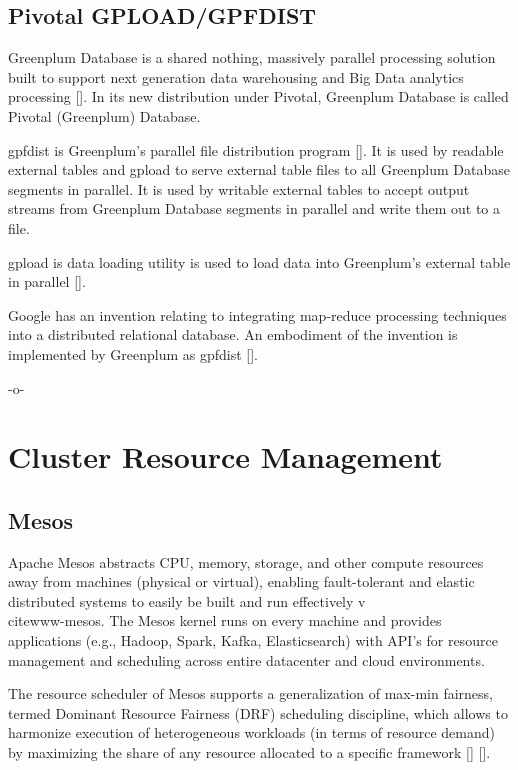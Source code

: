 \subsection{Pivotal GPLOAD/GPFDIST}

Greenplum Database is a shared nothing, massively parallel processing
solution built to support next generation data warehousing and Big
Data analytics processing [\cite{book-greenplum-gollapudi2013}]. In its
new distribution under Pivotal, Greenplum Database is called Pivotal
(Greenplum) Database.

gpfdist is Greenplum's parallel file distribution
program [\cite{www-gpfdist}]. It is used by readable external tables and
gpload to serve external table files to all Greenplum Database
segments in parallel. It is used by writable external tables to accept
output streams from Greenplum Database segments in parallel and write
them out to a file.

gpload is data loading utility is used to load data into Greenplum's
external table in parallel [\cite{book-greenplum-gollapudi2013}].

Google has an invention relating to integrating map-reduce processing
techniques into a distributed relational database. An embodiment of
the invention is implemented by Greenplum as
gpfdist [\cite{patent-google-gpf}].

     -o-

\section{Cluster Resource Management}
\label{S:o-cluster}


\subsection{Mesos }

Apache Mesos abstracts CPU, memory, storage, and other compute
resources away from machines (physical or virtual), enabling
fault-tolerant and elastic distributed systems to easily be built and
run effectively v\\cite{www-mesos}.  The Mesos kernel runs on every
machine and provides applications (e.g., Hadoop, Spark, Kafka,
Elasticsearch) with API's for resource management and scheduling
across entire datacenter and cloud environments.

The resource scheduler of Mesos supports a generalization of max-min
fairness, termed Dominant Resource Fairness (DRF) scheduling
discipline, which allows to harmonize execution of heterogeneous
workloads (in terms of resource demand) by maximizing the share of any
resource allocated to a specific framework
[\cite{paper-mesos-Abu-Dbai-2016}]
[\cite{paper-mesos-ghodsi2011dominant}].
     
